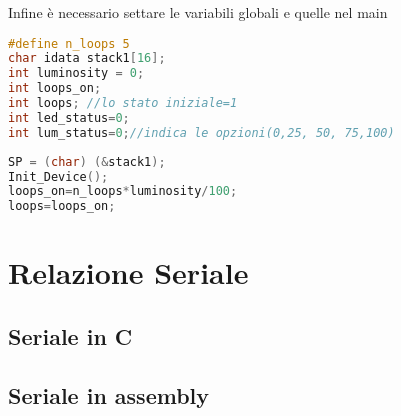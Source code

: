 \documentclass[main.tex]{subfiles}
\begin{document}
Infine è necessario settare le variabili globali e quelle nel main
\begin{lstlisting}[language=C,caption=Variabili globali]
#define n_loops 5
char idata stack1[16];
int luminosity = 0;
int loops_on;
int loops; //lo stato iniziale=1
int led_status=0;
int lum_status=0;//indica le opzioni(0,25, 50, 75,100)
\end{lstlisting}
\begin{lstlisting}[language=C,caption=main]
SP = (char) (&stack1);
Init_Device();
loops_on=n_loops*luminosity/100;
loops=loops_on;
\end{lstlisting}



\section{Relazione Seriale}
\subsection{Seriale in C}
\subsection{Seriale in assembly}
\end{document}
